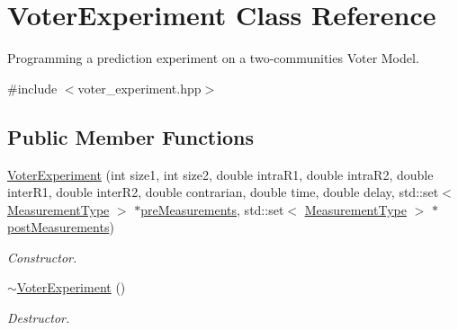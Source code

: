 \hypertarget{class_voter_experiment}{}\section{Voter\+Experiment Class Reference}
\label{class_voter_experiment}


Programming a prediction experiment on a two-\/communities Voter Model.  




{\ttfamily \#include $<$voter\+\_\+experiment.\+hpp$>$}

\subsection*{Public Member Functions}
\begin{DoxyCompactItemize}
\item 
\hyperlink{class_voter_experiment_ad7a7756aab9187e0a79fd40860a104ed}{Voter\+Experiment} (int size1, int size2, double intra\+R1, double intra\+R2, double inter\+R1, double inter\+R2, double contrarian, double time, double delay, std\+::set$<$ \hyperlink{voter__graph_8hpp_ad35f880f44d18d9c643f02c4057034f7}{Measurement\+Type} $>$ $\ast$\hyperlink{class_voter_experiment_a1de8c983105c4c2dabe6155f716bef93}{pre\+Measurements}, std\+::set$<$ \hyperlink{voter__graph_8hpp_ad35f880f44d18d9c643f02c4057034f7}{Measurement\+Type} $>$ $\ast$\hyperlink{class_voter_experiment_a858051eb0f9c27891f50ddfb982b2534}{post\+Measurements})
\begin{DoxyCompactList}\small\item\em Constructor. \end{DoxyCompactList}\item 
\hypertarget{class_voter_experiment_a1d3755542da65c490868ec76484fd92f}{}\hyperlink{class_voter_experiment_a1d3755542da65c490868ec76484fd92f}{$\sim$\+Voter\+Experiment} ()\label{class_voter_experiment_a1d3755542da65c490868ec76484fd92f}

\begin{DoxyCompactList}\small\item\em Destructor. \end{DoxyCompactList}\end{DoxyCompactItemize}
